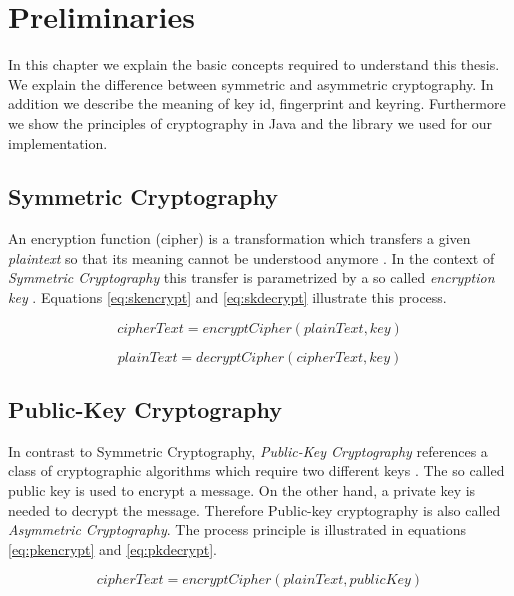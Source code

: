 \chapter{Preliminaries}
\label{chapter:pre}

In this chapter we explain the basic concepts required to understand this thesis. We explain the difference between symmetric and asymmetric cryptography. In addition we describe the meaning of key id, fingerprint and keyring. Furthermore we show the principles of cryptography in Java and the library we used for our implementation.

\section{Symmetric Cryptography} \label{section:pre:symcrypto}


An encryption function (cipher) is a transformation which transfers a given \textit{plaintext} so that its meaning cannot be understood anymore \citep[section 1.4]{HAC}. In the context of \textit{Symmetric Cryptography} this transfer is parametrized by a so called \textit{encryption key}  \citep[section 1.5]{HAC}. Equations \ref{eq:skencrypt} and \ref{eq:skdecrypt} illustrate this process.

\begin{equation} \label{eq:skencrypt}
	cipherText = encryptCipher(plainText, key)
\end{equation}

\begin{equation} \label{eq:skdecrypt}
	plainText = decryptCipher(cipherText, key)
\end{equation}


\section{Public-Key Cryptography}
\label{section:pre:publiccrypto}

In contrast to  {Symmetric Cryptography}, \textit{Public-Key Cryptography} references a class of cryptographic algorithms which require two different keys \citep[section 1.8]{HAC}. The so called public key is used to encrypt a message. On the other hand, a private key is needed to decrypt the message. Therefore Public-key cryptography is also called \textit{Asymmetric Cryptography}.  The process principle is illustrated in equations \ref{eq:pkencrypt} and \ref{eq:pkdecrypt}. 

\begin{equation} \label{eq:pkencrypt}
	cipherText = encryptCipher(plainText, publicKey)
\end{equation}

